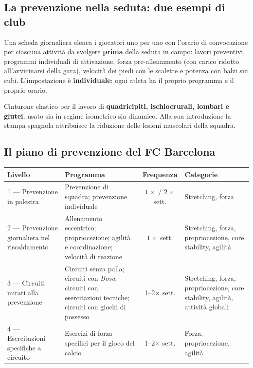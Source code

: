 \subsection{La prevenzione nella seduta: due esempi di club}

Una scheda giornaliera elenca i giocatori uno per uno con l'orario di convocazione per ciascuna
attività da svolgere \textbf{prima} della seduta in campo: lavori preventivi, programmi individuali
di attivazione, forza pre-allenamento (con carico ridotto all'avvicinarsi della gara), velocità dei
piedi con le scalette e potenza con balzi sui cubi. L'impostazione è \textbf{individuale}: ogni
atleta ha il proprio programma e il proprio orario.

Cinturone elastico per il lavoro di \textbf{quadricipiti, ischiocrurali, lombari e glutei}, usato sia
in regime isometrico sia dinamico. Alla sua introduzione la stampa spagnola attribuisce la
riduzione delle lesioni muscolari della squadra.

\subsection{Il piano di prevenzione del FC Barcelona}


\begin{table}[htbp]
  \centering
  \small
  \renewcommand{\arraystretch}{1.3}
  \begin{tabularx}{\textwidth}{|l|X|c|X|}
    \hline
    \textbf{Livello} & \textbf{Programma} & \textbf{Frequenza} & \textbf{Categorie} \\
    \hline
    1 --- Prevenzione in palestra & Prevenzione di squadra; prevenzione individuale &
      $1\times$ / $2\times$ sett. & Stretching, forza \\
    \hline
    2 --- Prevenzione giornaliera nel riscaldamento & Allenamento eccentrico; propriocezione;
      agilità e coordinazione; velocità di reazione & $1\times$ sett. & Stretching, forza,
      propriocezione, core stability, agilità \\
    \hline
    3 --- Circuiti mirati alla prevenzione & Circuiti senza palla; circuiti con \textit{Bosu};
      circuiti con esercitazioni tecniche; circuiti con giochi di possesso & 1--2$\times$ sett. &
      Stretching, forza, propriocezione, core stability, agilità, attività globali \\
    \hline
    4 --- Esercitazioni specifiche a circuito & Esercizi di forza specifici per il gioco del calcio &
      1--2$\times$ sett. & Forza, propriocezione, agilità \\
    \hline
  \end{tabularx}
\end{table}

